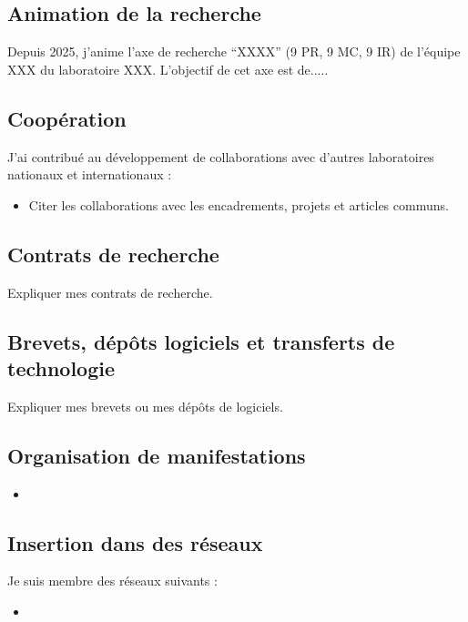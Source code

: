 \documentclass[french]{hdrapplication}
\begin{document}
\subsection{Animation de la recherche}

Depuis 2025, j'anime l'axe de recherche ``XXXX'' (9 PR, 9 MC, 9 IR) de l'équipe XXX du laboratoire XXX.
L'objectif de cet axe est de.....

\subsection{Coopération}

J'ai contribué au développement de collaborations avec d'autres laboratoires nationaux et internationaux :
\begin{itemize}
\item Citer les collaborations avec les encadrements, projets et articles communs.
\end{itemize}

\subsection{Contrats de recherche}

Expliquer mes contrats de recherche.

\subsection{Brevets, dépôts logiciels et transferts de technologie}

Expliquer mes brevets ou mes dépôts de logiciels.

\subsection{Organisation de manifestations}

\begin{itemize}
\item 
\end{itemize}

\subsection{Insertion dans des réseaux}

Je suis membre des réseaux suivants :
\begin{itemize}
\item 
\end{itemize}
\end{document}

